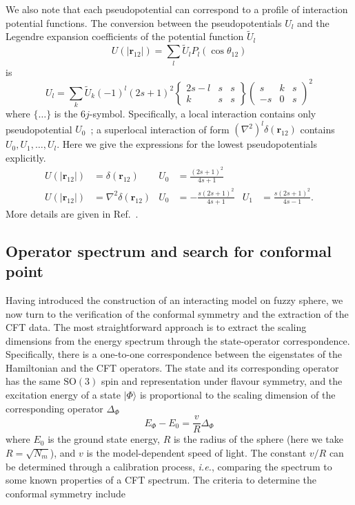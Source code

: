 \documentclass{timesjhep}
\begin{document}
We also note that each pseudopotential can correspond to a profile of interaction potential functions. The conversion between the pseudopotentials $U_l$ and the Legendre expansion coefficients of the potential function $\tilde{U}_l$
\begin{equation}
    U(|\mathbf{r}_{12}|)=\sum_l\tilde{U}_lP_l(\cos\theta_{12})
\end{equation} 
is 
\begin{equation} 
    U_l=\sum_k \tilde{U}_k(-1)^l(2s+1)^2\begin{Bmatrix}2s-l&s&s\\k&s&s\end{Bmatrix}\begin{pmatrix}s&k&s\\-s&0&s\end{pmatrix}^2 
\end{equation}
where $\{\dots\}$ is the $6j$-symbol. Specifically, a local interaction contains only pseudopotential $U_0$~; a superlocal interaction of form $(\nabla^2)^l\delta(\mathbf{r}_{12})$ contains $U_0,U_1,\dots,U_l$. Here we give the expressions for the lowest pseudopotentials explicitly. 
\begin{align}
    U(|\mathbf{r}_{12}|)&=\delta(\mathbf{r}_{12})&U_0&=\frac{(2s+1)^2}{4s+1}\nonumber\\
    U(|\mathbf{r}_{12}|)&=\nabla^2\delta(\mathbf{r}_{12})&U_0&=-\frac{s(2s+1)^2}{4s+1}&U_1&=\frac{s(2s+1)^2}{4s-1}.
\end{align}
More details are given in Ref.~\cite{Fan2024}. 

\subsection{Operator spectrum and search for conformal point}

Having introduced the construction of an interacting model on fuzzy sphere, we now turn to the verification of the conformal symmetry and the extraction of the CFT data. The most straightforward approach is to extract the scaling dimensions from the energy spectrum through the state-operator correspondence. Specifically, there is a one-to-one correspondence between the eigenstates of the Hamiltonian and the CFT operators. The state and its corresponding operator has the same $\mathrm{SO}(3)$ spin and representation under flavour symmetry, and the excitation energy of a state $|\Phi\rangle$ is proportional to the scaling dimension of the corresponding operator $\Delta_\Phi$ 
\begin{equation}
    E_\Phi-E_0=\frac{v}{R}\Delta_\Phi
\end{equation}
where $E_0$ is the ground state energy, $R$ is the radius of the sphere (here we take $R=\sqrt{N_m}$), and $v$ is the model-dependent speed of light. The constant $v/R$ can be determined through a calibration process, \textit{i.e.}, comparing the spectrum to some known properties of a CFT spectrum. The criteria to determine the conformal symmetry include 
\end{document}
